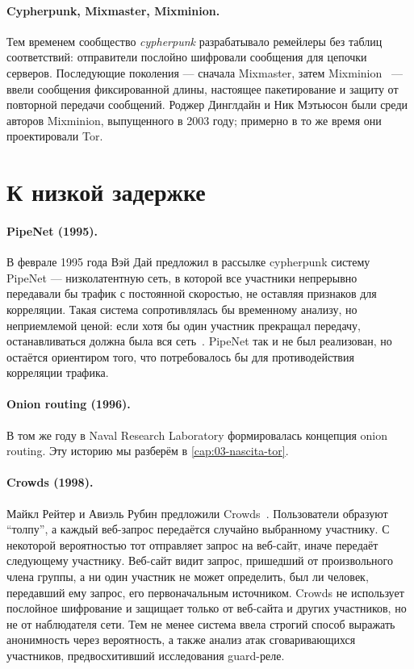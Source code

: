 \paragraph{Cypherpunk, Mixmaster, Mixminion.} Тем временем сообщество \emph{cypherpunk} разрабатывало ремейлеры без таблиц соответствий: отправители послойно шифровали сообщения для цепочки серверов. Последующие поколения --- сначала Mixmaster, затем Mixminion~\cite{danezis2003mixminion} --- ввели сообщения фиксированной длины, настоящее пакетирование и защиту от повторной передачи сообщений. Роджер Динглдайн и Ник Мэтьюсон были среди авторов Mixminion, выпущенного в 2003 году; примерно в то же время они проектировали Tor.

\section{К низкой задержке}\label{sec:radici-bassa}

\paragraph{PipeNet (1995).} В феврале 1995 года Вэй Дай предложил в рассылке cypherpunk систему PipeNet --- низколатентную сеть, в которой все участники непрерывно передавали бы трафик с постоянной скоростью, не оставляя признаков для корреляции. Такая система сопротивлялась бы временному анализу, но неприемлемой ценой: если хотя бы один участник прекращал передачу, останавливаться должна была вся сеть~\cite{syverson2011peel}. PipeNet так и не был реализован, но остаётся ориентиром того, что потребовалось бы для противодействия корреляции трафика.

\paragraph{Onion routing (1996).} В том же году в Naval Research Laboratory формировалась концепция onion routing. Эту историю мы разберём в \cref{cap:03-nascita-tor}.

\paragraph{Crowds (1998).} Майкл Рейтер и Авиэль Рубин предложили Crowds~\cite{reiter1998crowds}. Пользователи образуют \enquote{толпу}, а каждый веб-запрос передаётся случайно выбранному участнику. С некоторой вероятностью тот отправляет запрос на веб-сайт, иначе передаёт следующему участнику. Веб-сайт видит запрос, пришедший от произвольного члена группы, а ни один участник не может определить, был ли человек, передавший ему запрос, его первоначальным источником. Crowds не использует послойное шифрование и защищает только от веб-сайта и других участников, но не от наблюдателя сети. Тем не менее система ввела строгий способ выражать анонимность через вероятность, а также анализ атак сговаривающихся участников, предвосхитивший исследования guard-реле.

